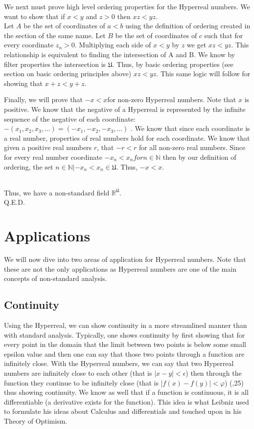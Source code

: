 \documentclass[12pt]{report}
\newcommand{\R}{\mathbb{R}}
\newcommand{\N}{\mathbb{N}}
\newcommand{\U}{\mathfrak{U}}
\begin{document}
We next must prove high level ordering properties for the Hyperreal numbers. \newline
We want to show that if $x<y$ and $z>0$ then $xz<yz$. \\
Let $A$ be the set of coordinates of $a<b$ using the definition of ordering created in the section of the same name.
Let $B$ be the set of coordinates of $c$ such that for every coordinate $z_n > 0$.
Multiplying each side of $x<y$ by $z$ we get $xz<yz$.
This relationship is equivalent to finding the intersection of A and B.
We know by filter properties the intersection is $\U$.
Thus, by basic ordering properties (see section on basic ordering principles above) $xz<yz$.
This same logic will follow for showing that $x+z < y+z$.

\newline \par
Finally, we will prove that $-x <x $for non-zero Hyperreal numbers.
Note that $x$ is positive.
We know that the negative of a Hyperreal is represented by the infinite sequence of the negative of each coordinate: $-(x_1, x_2,x_3,\ldots) = (-x_1,- x_2,-x_3,\ldots)$ .
We know that since each coordinate is a real number, properties of real numbers hold for each coordinate.
We know that given a positive real numbers $r$, that $-r< r$ for all non-zero real numbers.
Since for every real number coordinate $-x_n <x_n for n \in \N $ then by our definition of ordering, the set ${n \in \N| -x_n < x_n } \in \U$.
Thus, $-x <x $.

\\ \newline
Thus, we have a non-standard field $\R^{\U}$.\\
Q.E.D.


\chapter{Applications}
We will now dive into two areas of application for Hyperreal numbers.
Note that these are not the only applications as Hyperreal numbers are one of the main concepts of non-standard analysis.
\section*{Continuity}
Using the Hyperreal, we can show continuity in a more streamlined manner than with standard analysis.
Typically, one shows continuity by first showing that for every point in the domain that the limit between two points is below some small epsilon value and then one can say that those two points through a function are infinitely close.
With the Hyperreal numbers, we can say that two Hyperreal numbers are infinitely close to each other (that is $|x-y|< \epsilon$) then through the function they continue to be infinitely close (that is |$f(x)-f(y)|<\varphi$) (,25) thus showing continuity.
We know as well that if a function is continuous, it is all differentiable (a derivative exists for the function).
This idea is what Leibniz used to formulate his ideas about Calculus and differentials and touched upon in his Theory of Optimism.
\end{document}
